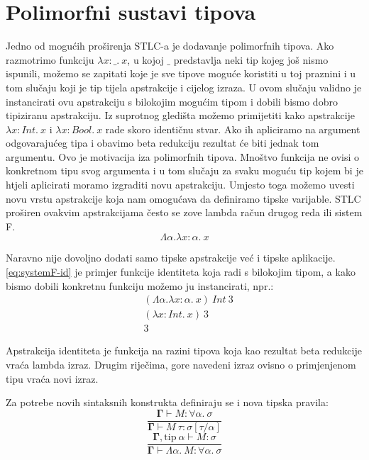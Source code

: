 \documentclass[diplomskirad,upload]{fer}
\begin{document}
\section{Polimorfni sustavi tipova}
\label{sec:poly}

Jedno od mogućih proširenja STLC-a je dodavanje polimorfnih tipova. Ako
razmotrimo funkciju \(\lambda x : \_ .\ x\), u kojoj \(\_\) predstavlja neki tip
kojeg još nismo ispunili, možemo se zapitati koje je sve tipove moguće koristiti u
toj praznini i u tom slučaju koji je tip tijela apstrakcije i cijelog izraza. U
ovom slučaju validno je instancirati ovu apstrakciju s bilokojim mogućim tipom i
dobili bismo dobro tipiziranu apstrakciju. Iz suprotnog gledišta možemo
primijetiti kako apstrakcije \(\lambda x : Int .\ x\) i \(\lambda x : Bool .\
x\) rade skoro identičnu stvar. Ako ih apliciramo na argument odgovarajućeg tipa
i obavimo beta redukciju rezultat će biti jednak tom argumentu. Ovo je
motivacija iza polimorfnih tipova. Mnoštvo funkcija ne ovisi o konkretnom tipu
svog argumenta i u tom slučaju za svaku moguću tip kojem bi je htjeli aplicirati
moramo izgraditi novu apstrakciju. Umjesto toga možemo uvesti novu vrstu
apstrakcije koja nam omogućava da definiramo tipske varijable. STLC proširen
ovakvim apstrakcijama često se zove lambda račun drugog reda ili sistem F.
\begin{equation}
    \Lambda \alpha. \lambda x : \alpha.\ x
    \label{eq:systemF-id}
\end{equation}

Naravno nije dovoljno dodati samo tipske apstrakcije već i tipske aplikacije.
\ref{eq:systemF-id} je primjer funkcije identiteta koja radi s bilokojim tipom,
a kako bismo dobili konkretnu funkciju možemo ju instancirati, npr.:
\begin{align*}
    &(\Lambda \alpha. \lambda x : \alpha.\ x)\ Int\ 3 \\
    &(\lambda x : Int.\ x)\ 3 \\
    &3
\end{align*}

Apstrakcija identiteta je funkcija na razini tipova koja kao rezultat beta
redukcije vraća lambda izraz. Drugim riječima, gore navedeni izraz ovisno o
primjenjenom tipu vraća novi izraz.

Za potrebe novih sintaksnih konstrukta definiraju se i nova tipska pravila:
\begin{equation}
    \frac{\mathbf{\Gamma} \vdash M : \forall \alpha .\ \sigma}{\mathbf{\Gamma}
    \vdash M\ \tau : \sigma [\tau / \alpha]}
    \label{eq:systemF-tapp}
\end{equation}
\begin{equation}
    \frac{\mathbf{\Gamma}, \text{tip}\ \alpha \vdash M : \sigma}
    {\mathbf{\Gamma} \vdash \Lambda \alpha .\ M : \forall \alpha .\ \sigma }
    \label{eq:systemF-tabs}
\end{equation}
\end{document}
